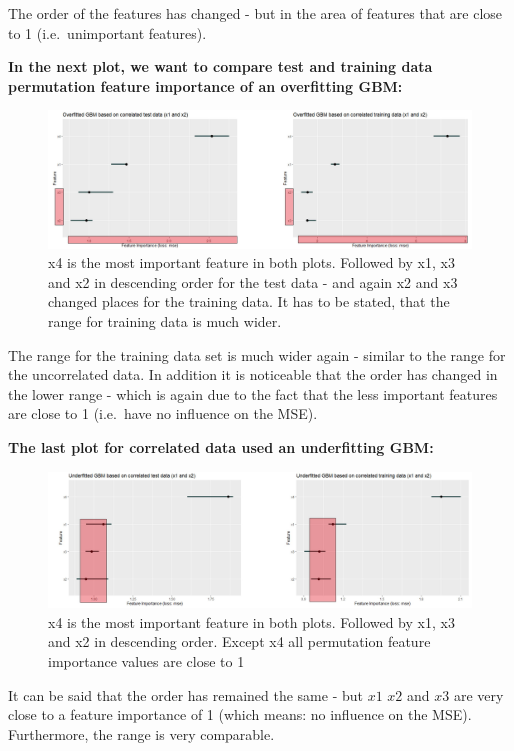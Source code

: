 \documentclass[
]{krantz}
\begin{document}
The order of the features has changed - but in the area of features that are close to 1 (i.e.~unimportant features).

\textbf{In the next plot, we want to compare test and training data permutation feature importance of an overfitting GBM:}

\begin{figure}
\includegraphics[width=40.06in]{images/correlated_over} \caption{x4 is the most important feature in both plots. Followed by x1, x3 and x2 in descending order for the test data - and again x2 and x3 changed places for the training data. It has to be stated, that the range for training data is much wider.}\label{fig:unnamed-chunk-55}
\end{figure}

The range for the training data set is much wider again - similar to the range for the uncorrelated data. In addition it is noticeable that the order has changed in the lower range - which is again due to the fact that the less important features are close to 1 (i.e.~have no influence on the MSE).

\textbf{The last plot for correlated data used an underfitting GBM:}

\begin{figure}
\includegraphics[width=40.57in]{images/correlated_under} \caption{x4 is the most important feature in both plots. Followed by x1, x3 and x2 in descending order. Except x4 all permutation feature importance values are close to 1}\label{fig:unnamed-chunk-56}
\end{figure}

It can be said that the order has remained the same - but \(x1\) \(x2\) and \(x3\) are very close to a feature importance of 1 (which means: no influence on the MSE). Furthermore, the range is very comparable.
\end{document}
